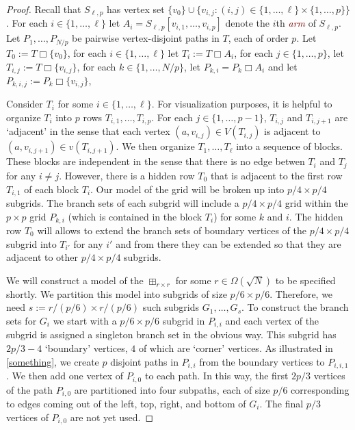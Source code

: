 \documentclass[kpfonts,lotsofwhite]{patmorin}
\newcommand{\defn}[1]{\textcolor{Maroon}{\emph{#1}}}
\newcommand{\boxprod}{\mathbin{\Box}}
\theoremstyle{plain}
\theoremstyle{definition}
\begin{document}
\begin{proof}
  Recall that $S_{\ell,p}$ has vertex set $\{v_0\}\cup\{v_{i,j}:(i,j)\in \{1,\ldots,\ell\}\times\{1,\ldots,p\}\}$. For each $i\in\{1,\ldots,\ell\}$ let $A_i=S_{\ell,p}[v_{i,1},\ldots,v_{i,p}]$ denote the $i$th \defn{arm} of $S_{\ell,p}$.  Let $P_1,\ldots,P_{N/p}$ be pairwise vertex-disjoint paths in $T$, each of order $p$.  Let $T_0:=T\boxprod \{v_0\}$, for each $i\in\{1,\ldots,\ell\}$ let $T_i:=T\boxprod A_i$, for each $j\in \{1,\ldots,p\}$, let $T_{i,j}:=T\boxprod \{v_{i,j}\}$, for each $k\in\{1,\ldots,N/p\}$, let $P_{k,i}=P_k\boxprod A_i$ and let $P_{k,i,j}:=P_k\boxprod \{v_{i,j}\}$,

  Consider $T_i$ for some $i\in\{1,\ldots,\ell\}$. For visualization purposes, it is helpful to organize $T_i$ into $p$ rows $T_{i,1},\ldots,T_{i,p}$.  For each $j\in\{1,\ldots,p-1\}$, $T_{i,j}$ and $T_{i,j+1}$ are `adjacent' in the sense that each vertex $(a,v_{i,j})\in V(T_{i,j})$ is adjacent to $(a,v_{i,j+1})\in v(T_{i,j+1})$.  We then organize $T_1,\ldots,T_{\ell}$ into a sequence of blocks. These blocks are independent in the sense that there is no edge betwen $T_{i}$ and $T_j$ for any $i\neq j$.  However, there is a hidden row $T_0$ that is adjacent to the first row $T_{i,1}$ of each block $T_i$. Our model of the grid will be broken up into $p/4\times p/4$ subgrids. The branch sets of each subgrid will include a $p/4\times p/4$ grid within the $p\times p$ grid $P_{k,i}$ (which is contained in the block $T_i$) for some $k$ and $i$.  The hidden row $T_0$ will allows to extend the branch sets of boundary vertices of the $p/4\times p/4$ subgrid into $T_{i'}$ for any $i'$ and from there they can be extended so that they are adjacent to other $p/4\times p/4$ subgrids.

  We will construct a model of the $\boxplus_{r\times r}$ for some $r\in \Omega(\sqrt{N})$ to be specified shortly.  We partition this model into subgrids of size $p/6\times p/6$.  Therefore, we need $s:=r/(p/6)\times r/(p/6)$ such subgrids $G_1,\ldots,G_s$.   To construct the branch sets for $G_i$ we start with a $p/6\times p/6$ subgrid in $P_{i,i}$ and each vertex of the subgrid is assigned a singleton branch set in the obvious way.  This subgrid has $2p/3-4$ `boundary' vertices, $4$ of which are `corner' vertices. As illustrated in \cref{something}, we create $p$ disjoint paths in $P_{i,i}$ from the boundary vertices to $P_{i,i,1}$.  We then add one vertex of $P_{i,0}$ to each path.  In this way, the first $2p/3$ vertices of the path $P_{i,0}$ are partitioned into four subpaths, each of size $p/6$ corresponding to edges coming out of the left, top, right, and bottom of $G_i$.  The final $p/3$ vertices of $P_{i,0}$ are not yet used.


\end{proof}
\end{document}
